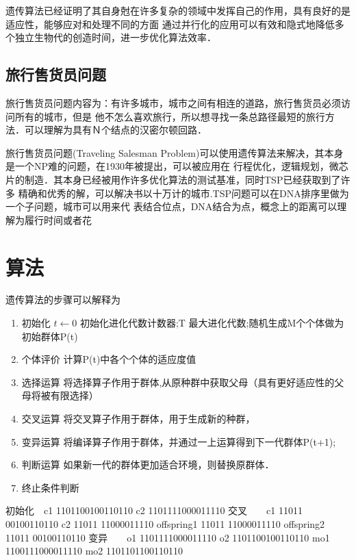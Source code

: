     遗传算法已经证明了其自身尅在许多复杂的领域中发挥自己的作用，具有良好的是适应性，能够应对和处理不同的方面
通过并行化的应用可以有效和隐式地降低多个独立生物代的创造时间，进一步优化算法效率．
    
\subsection{旅行售货员问题}
    旅行售货员问题内容为：有许多城市，城市之间有相连的道路，旅行售货员必须访问所有的城市，但是
他不怎么喜欢旅行，所以想寻找一条总路径最短的旅行方法．可以理解为具有Ｎ个结点的汉密尔顿回路．

    旅行售货员问题(Traveling Salesman Problem)可以使用遗传算法来解决，其本身是一个NP难的问题，在1930年被提出，可以被应用在
行程优化，逻辑规划，微芯片的制造．其本身已经被用作许多优化算法的测试基准，同时TSP已经获取到了许多
精确和优秀的解，可以解决书以十万计的城市.TSP问题可以在DNA排序里做为一个子问题，城市可以用来代
表结合位点，DNA结合为点，概念上的距离可以理解为履行时间或者花

\section{算法}

    遗传算法的步骤可以解释为
    \begin{enumerate}
    \item 初始化 $t\leftarrow0$ 初始化进化代数计数器;T 最大进化代数;随机生成M个个体做为初始群体P(t)
    \item 个体评价  计算P(t)中各个个体的适应度值
    \item 选择运算  将选择算子作用于群体,从原种群中获取父母（具有更好适应性的父母将被有限选择）
    \item 交叉运算  将交叉算子作用于群体，用于生成新的种群，
    \item 变异运算  将编译算子作用于群体，并通过一上运算得到下一代群体P(t+1);
    \item 判断运算  如果新一代的群体更加适合环境，则替换原群体．
    \item 终止条件判断 
    \end{enumerate}

    初始化　c1 1101100100110110
            c2 1101111000011110
    交叉　　c1 11011 00100110110
            c2 11011 11000011110
            offspring1 11011 11000011110
            offspring2 11011 00100110110
    变异　　o1  1101111000011110
            o2  1101100100110110
            mo1 1100111000011110
            mo2 1101101100110110

